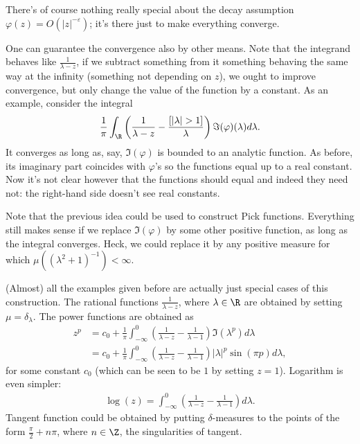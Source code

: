 There's of course nothing really special about the decay assumption $\varphi(z) = O(|z|^{-\varepsilon})$; it's there just to make everything converge.

One can guarantee the convergence also by other means. Note that the integrand behaves like $\frac{1}{\lambda - z}$, if we subtract something from it something behaving the same way at the infinity (something not depending on $z$), we ought to improve convergence, but only change the value of the function by a constant. As an example, consider the integral
\begin{align*}
	\frac{1}{\pi}\int_{\R} \left(\frac{1}{\lambda - z} - \frac{[|\lambda| > 1]}{\lambda} \right) \Im(\varphi)(\lambda)d \lambda.
\end{align*}
It converges as long as, say, $ \Im(\varphi)$ is bounded to an analytic function. As before, its imaginary part coincides with $\varphi$'s so the functions equal up to a real constant. Now it's not clear however that the functions should equal and indeed they need not: the right-hand side doesn't see real constants.

Note that the previous idea could be used to construct Pick functions. Everything still makes sense if we replace $\Im(\varphi)$ by some other positive function, as long as the integral converges. Heck, we could replace it by any positive measure for which $\mu((\lambda^2 + 1)^{-1}) < \infty$.

(Almost) all the examples given before are actually just special cases of this construction. The rational functions $\frac{1}{\lambda - z}$, where $\lambda \in \R$ are obtained by setting $\mu = \delta_{\lambda}$. The power functions are obtained as
\begin{align*}
	z^{p} &= c_{0} + \frac{1}{\pi}\int_{-\infty}^{0} \left(\frac{1}{\lambda - z} - \frac{1}{\lambda - 1}\right) \Im(\lambda^{p}) d \lambda \\
	&= c_{0} + \frac{1}{\pi}\int_{-\infty}^{0} \left(\frac{1}{\lambda - z} - \frac{1}{\lambda - 1}\right) |\lambda|^{p} \sin(\pi p) d \lambda,
\end{align*}
for some constant $c_{0}$ (which can be seen to be $1$ by setting $z = 1$). Logarithm is even simpler:
\begin{align*}
	\log(z) = \int_{-\infty}^{0} \left(\frac{1}{\lambda - z} - \frac{1}{\lambda - 1}\right) d \lambda.
\end{align*}
Tangent function could be obtained by putting $\delta$-measures to the points of the form $\frac{\pi}{2} + n \pi$, where $n \in \Z$, the singularities of tangent.

